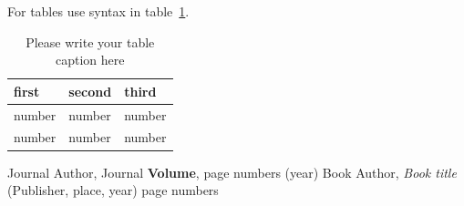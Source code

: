 \documentclass[twocolumn]{webofc}
\begin{document}
For tables use syntax in table~\ref{tab-1}.
\begin{table}
\centering
\caption{Please write your table caption here}
\label{tab-1}       %
\begin{tabular}{lll}
\hline
first & second & third  \\\hline
number & number & number \\
number & number & number \\\hline
\end{tabular}
\vspace*{5cm}  %
\end{table}
%
% 
%
%
\begin{thebibliography}{}
%
%
Journal Author, Journal \textbf{Volume}, page numbers (year)
Book Author, \textit{Book title} (Publisher, place, year) page numbers
\end{thebibliography}
\end{document}

